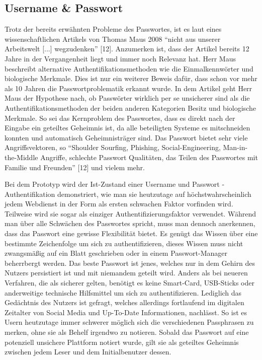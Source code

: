 \subsection{Username \& Passwort}
Trotz der bereits erwähnten Probleme des Passwortes, ist es laut eines wissenschaftlichen Artikels von Thomas Maus 2008 ``nicht aus unserer Arbeitswelt [...] wegzudenken'' [12]. Anzumerken ist, dass der Artikel bereits 12 Jahre in der Vergangenheit liegt und immer noch Relevanz hat. Herr Maus beschreibt alternative Authentifikationsmethoden wie die Einmalkennwörter und biologische Merkmale. Dies ist nur ein weiterer Beweis dafür, dass schon vor mehr als 10 Jahren die Passwortproblematik erkannt wurde. In dem Artikel geht Herr Maus der Hypothese nach, ob Passwörter wirklich per se unsicherer sind als die Authentifikationsmethoden der beiden anderen Kategorien Besitz und biologische Merkmale. So sei das Kernproblem des Passwortes, dass es direkt nach der Eingabe ein geteiltes Geheimnis ist, da alle beteiligten Systeme es mitschneiden konnten und automatisch Geheimnisträger sind. Das Passwort bietet sehr viele Angriffsvektoren, so ``Shoulder Sourfing, Phishing, Social-Engineering, Man-in-the-Middle Angriffe, schlechte Passwort Qualitäten, das Teilen des Passwortes mit Familie und Freunden'' [12] und vielem mehr.

Bei dem Prototyp wird der Ist-Zustand einer Username und Passwort - Authentifikation demonstriert, wie man sie heutzutage auf höchstwahrscheinlich jedem Webdienst in der Form als ersten schwachen Faktor vorfinden wird. Teilweise wird sie sogar als einziger Authentifizierungsfaktor verwendet. Während man über alle Schwächen des Passwortes spricht, muss man dennoch anerkennen, dass das Passwort eine gewisse Flexibilität bietet. Es genügt das Wissen über eine bestimmte Zeichenfolge um sich zu authentifizieren, dieses Wissen muss nicht zwangsmäßig auf ein Blatt geschrieben oder in einem Passwort-Manager beherrbergt werden. Das beste Passwort ist jenes, welches nur in dem Gehirn des Nutzers persistiert ist und mit niemandem geteilt wird. Anders als bei neueren Verfahren, die als sicherer gelten, benötigt es keine Smart-Card, USB-Sticks oder anderweitige technische Hilfsmittel um sich zu authentifizieren. Lediglich das Gedächtnis des Nutzers ist gefragt, welches allerdings fortlaufend im digitalen Zeitalter von Social Media und Up-To-Date Informationen, nachlässt. So ist es Usern heutzutage immer schwerer möglich sich die verschiedenen Passphrasen zu merken, ohne sie als Behelf irgendwo zu notieren. Sobald das Passwort auf eine potenziell unsichere Plattform notiert wurde, gilt sie als geteiltes Geheimnis zwischen jedem Leser und dem Initialbenutzer dessen.

